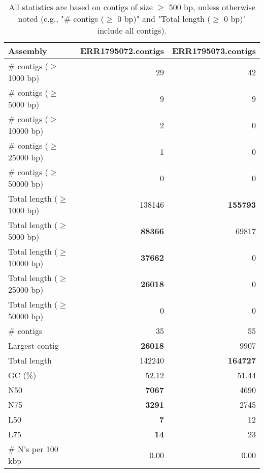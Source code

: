 \documentclass[12pt,a4paper]{article}
\begin{document}
\begin{table}[ht]
\begin{center}
\caption{All statistics are based on contigs of size $\geq$ 500 bp, unless otherwise noted (e.g., "\# contigs ($\geq$ 0 bp)" and "Total length ($\geq$ 0 bp)" include all contigs).}
\begin{tabular}{|l*{2}{|r}|}
\hline
Assembly & ERR1795072.contigs & ERR1795073.contigs \\ \hline
\# contigs ($\geq$ 1000 bp) & 29 & 42 \\ \hline
\# contigs ($\geq$ 5000 bp) & 9 & 9 \\ \hline
\# contigs ($\geq$ 10000 bp) & 2 & 0 \\ \hline
\# contigs ($\geq$ 25000 bp) & 1 & 0 \\ \hline
\# contigs ($\geq$ 50000 bp) & 0 & 0 \\ \hline
Total length ($\geq$ 1000 bp) & 138146 & {\bf 155793} \\ \hline
Total length ($\geq$ 5000 bp) & {\bf 88366} & 69817 \\ \hline
Total length ($\geq$ 10000 bp) & {\bf 37662} & 0 \\ \hline
Total length ($\geq$ 25000 bp) & {\bf 26018} & 0 \\ \hline
Total length ($\geq$ 50000 bp) & 0 & 0 \\ \hline
\# contigs & 35 & 55 \\ \hline
Largest contig & {\bf 26018} & 9907 \\ \hline
Total length & 142240 & {\bf 164727} \\ \hline
GC (\%) & 52.12 & 51.44 \\ \hline
N50 & {\bf 7067} & 4690 \\ \hline
N75 & {\bf 3291} & 2745 \\ \hline
L50 & {\bf 7} & 12 \\ \hline
L75 & {\bf 14} & 23 \\ \hline
\# N's per 100 kbp & 0.00 & 0.00 \\ \hline
\end{tabular}
\end{center}
\end{table}
\end{document}
